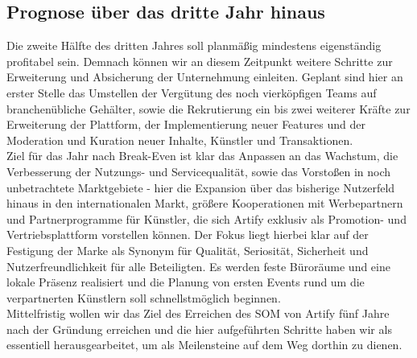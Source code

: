 \documentclass[11pt,a4paper]{report}
\begin{document}
\subsection{Prognose über das dritte Jahr hinaus}
Die zweite Hälfte des dritten Jahres soll planmäßig mindestens eigenständig profitabel sein. Demnach können wir an diesem Zeitpunkt weitere Schritte zur Erweiterung und Absicherung der Unternehmung einleiten. Geplant sind hier an erster Stelle das Umstellen der Vergütung des noch vierköpfigen Teams auf branchenübliche Gehälter, sowie die Rekrutierung ein bis zwei weiterer Kräfte zur Erweiterung der Plattform, der Implementierung neuer Features und der Moderation und Kuration neuer Inhalte, Künstler und Transaktionen.\\
Ziel für das Jahr nach Break-Even ist klar das Anpassen an das Wachstum, die Verbesserung der Nutzungs- und Servicequalität, sowie das Vorstoßen in noch unbetrachtete Marktgebiete - hier die Expansion über das bisherige Nutzerfeld hinaus in den internationalen Markt, größere Kooperationen mit Werbepartnern und Partnerprogramme für Künstler, die sich Artify exklusiv als Promotion- und Vertriebsplattform vorstellen können. Der Fokus liegt hierbei klar auf der Festigung der Marke als Synonym für Qualität, Seriosität, Sicherheit und Nutzerfreundlichkeit für alle Beteiligten. Es werden feste Büroräume und eine lokale Präsenz realisiert und die Planung von ersten Events rund um die verpartnerten Künstlern soll schnellstmöglich beginnen.\\
Mittelfristig wollen wir das Ziel des Erreichen des SOM von Artify fünf Jahre nach der Gründung erreichen und die hier aufgeführten Schritte haben wir als essentiell herausgearbeitet, um als Meilensteine auf dem Weg dorthin zu dienen.
\end{document}
